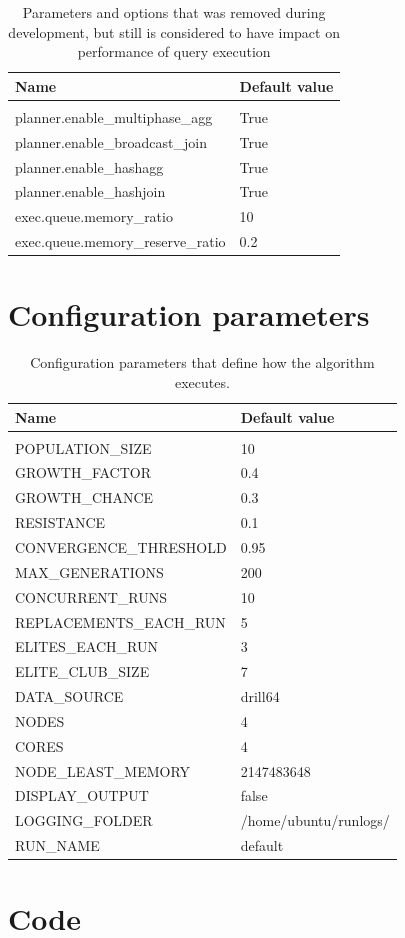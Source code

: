 \documentclass[a4paper,english]{report}
\begin{document}
\begin{table}[H]
	\centering
	\caption{Parameters and options that was removed during development, but still is considered to have impact on performance of query execution}
	\label{table:removed_params}
	\begin{tabular}{ll}
		\\
		\multicolumn{1}{l}{\bfseries Name} & \multicolumn{1}{l}{\bfseries Default value} \\ \hline \\
		planner.enable\_multiphase\_agg & True  \\
		planner.enable\_broadcast\_join & True  \\
		planner.enable\_hashagg & True  \\
		planner.enable\_hashjoin & True  \\
		exec.queue.memory\_ratio & 10  \\ 
		exec.queue.memory\_reserve\_ratio & 0.2  \\
	\end{tabular}
\end{table}

\chapter{Configuration parameters}
\begin{table}[H]
	\centering
	\caption{Configuration parameters that define how the algorithm executes.}
	\label{table:conf_params}
	\begin{tabular}{ll}
		\\
		\multicolumn{1}{l}{\bfseries Name} & \multicolumn{1}{l}{\bfseries Default value} \\ \hline \\
			POPULATION\_SIZE& 10 \\
			GROWTH\_FACTOR & 0.4 \\
			GROWTH\_CHANCE & 0.3 \\
			RESISTANCE & 0.1 \\
			
			CONVERGENCE\_THRESHOLD & 0.95 \\
			MAX\_GENERATIONS & 200 \\
			CONCURRENT\_RUNS & 10 \\
			
			REPLACEMENTS\_EACH\_RUN & 5 \\
			ELITES\_EACH\_RUN & 3 \\
			ELITE\_CLUB\_SIZE & 7 \\
			
			DATA\_SOURCE & drill64 \\
			NODES & 4 \\
			CORES & 4 \\
			NODE\_LEAST\_MEMORY & 2147483648 \\
			
			DISPLAY\_OUTPUT & false \\
			LOGGING\_FOLDER & /home/ubuntu/runlogs/ \\
			RUN\_NAME & default \\
	\end{tabular}
\end{table}

\chapter{Code}
\end{document}
